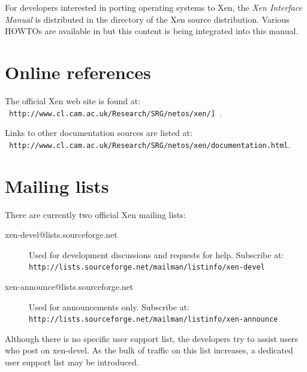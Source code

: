 \documentclass[11pt,twoside,final,openright]{xenstyle}
\begin{document}
For developers interested in porting operating systems to Xen, the
{\em Xen Interface Manual} is distributed in the 
directory of the Xen source distribution.  Various HOWTOs are
available in  but this content is being integrated
into this manual.

\section{Online references}

The official Xen web site is found at: \\
{\tt
http://www.cl.cam.ac.uk/Research/SRG/netos/xen/] }.

Links to other
documentation sources are listed at: \\ {\tt
http://www.cl.cam.ac.uk/Research/SRG/netos/xen/documentation.html}.

\section{Mailing lists}

There are currently two official Xen mailing lists:

\begin{description}
\item[xen-devel@lists.sourceforge.net] Used for development
discussions and requests for help.  Subscribe at: \\
{\tt http://lists.sourceforge.net/mailman/listinfo/xen-devel}
\item[xen-announce@lists.sourceforge.net] Used for announcements only.
Subscribe at: \\
{\tt http://lists.sourceforge.net/mailman/listinfo/xen-announce}
\end{description}

Although there is no specific user support list, the developers try to
assist users who post on xen-devel.  As the bulk of traffic on this
list increases, a dedicated user support list may be introduced.
\end{document}
